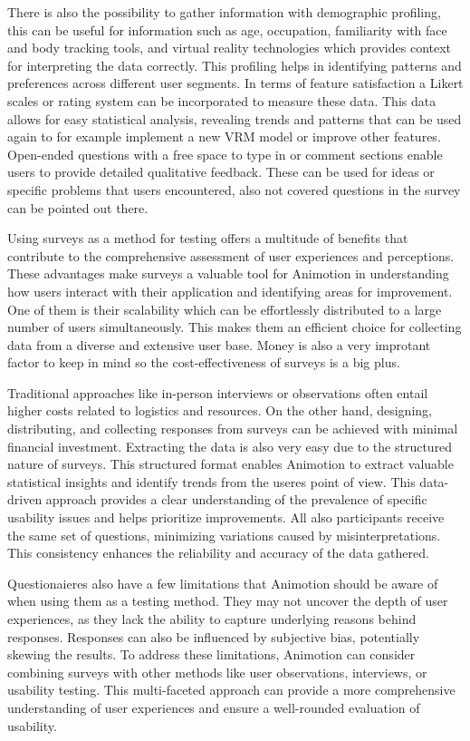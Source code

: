 There is also the possibility to gather information with demographic profiling, this can be useful for information such as 
age, occupation, familiarity with face and body tracking tools, and virtual reality technologies which provides context for interpreting the data correctly.
This profiling helps in identifying patterns and preferences across different user segments.
In terms of feature satisfaction a Likert scales or rating system can be incorporated to measure these data.
This data allows for easy statistical analysis, revealing trends and patterns that can be used again to for example implement a new VRM model or improve other features.
Open-ended questions with a free space to type in or comment sections enable users to provide detailed qualitative feedback.
These can be used for ideas or specific problems that users encountered, also not covered questions in the survey can be pointed out there. \cite{syp}

Using surveys as a method for testing offers a multitude of benefits that contribute to the comprehensive assessment of user experiences and perceptions. 
These advantages make surveys a valuable tool for Animotion in understanding how users interact with their application and identifying areas for improvement.
One of them is their scalability which can be effortlessly distributed to a large number of users simultaneously. 
This makes them an efficient choice for collecting data from a diverse and extensive user base. 
Money is also a very improtant factor to keep in mind so the cost-effectiveness of surveys is a big plus. 

Traditional approaches like in-person interviews or observations often entail higher 
costs related to logistics and resources. On the other hand, designing, distributing, and collecting responses from surveys can be 
achieved with minimal financial investment. Extracting the data is also very easy due to the structured nature of surveys.
This structured format enables Animotion to extract valuable statistical insights and identify trends from the useres point of view.
This data-driven approach provides a clear understanding of the prevalence of specific usability issues and helps prioritize improvements.
All also participants receive the same set of questions, minimizing variations caused by misinterpretations. 
This consistency enhances the reliability and accuracy of the data gathered.

Questionaieres also have a few limitations that Animotion should be aware of when using them as a testing method.
They may not uncover the depth of user experiences, as they lack the ability to capture underlying reasons behind responses. 
Responses can also be influenced by subjective bias, potentially skewing the results.
To address these limitations, Animotion can consider combining surveys with other methods like user observations, interviews, 
or usability testing. This multi-faceted approach can provide a more comprehensive understanding of user experiences and 
ensure a well-rounded evaluation of usability. \cite{questionaire}

